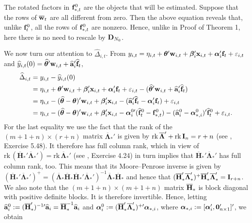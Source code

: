 \documentclass[12pt,fleqn]{article}
\begin{document}
The rotated factors in $\mathbf{f}_{*,t}^0$ are the objects that will be estimated. Suppose that the rows of $\overline {\mathbf{w}}_{t}$ are all different from zero. Then the above equation reveals that, unlike $\mathbf{f}_{t}^0$, all the rows of $\mathbf{f}_{*,t}^0$ are nonzero. Hence, unlike in Proof of Theorem 1, here there is no need to rescale by $\mathbf{D}_{N_0}$.

We now turn our attention to $\widehat \Delta_{i,t}$. From $y_{i,t} = \eta_{i,t} + \boldsymbol{\theta}'\mathbf{w}_{i,t} + \boldsymbol{\beta}_i'\mathbf{x}_{i,t} + \boldsymbol{\alpha}_i'\mathbf{f}_t + \varepsilon_{i,t}$ and $\widehat y_{i,t}(0) = \widehat{\boldsymbol{\theta}}'\mathbf{w}_{i,t} + \widehat{\mathbf{a}}_{i}'\widehat{\mathbf{f}}_{t}$,
\begin{align}
\widehat \Delta_{i,t} & = y_{i,t} - \widehat y_{i,t}(0) \notag\\
& = \eta_{i,t} + \boldsymbol{\theta}'\mathbf{w}_{i,t} + \boldsymbol{\beta}_i'\mathbf{x}_{i,t} + \boldsymbol{\alpha}_i'\mathbf{f}_t + \varepsilon_{i,t} - (\widehat{\boldsymbol{\theta}}'\mathbf{w}_{i,t} +  \widehat{\mathbf{a}}_{i}'\widehat{\mathbf{f}}_{t} )  \notag\\
& = \eta_{i,t} - (\widehat{\boldsymbol{\theta}} - \boldsymbol{\theta})'\mathbf{w}_{i,t} + \boldsymbol{\beta}_i'\mathbf{x}_{i,t} - (\widehat{\mathbf{a}}_{i}'\widehat{\mathbf{f}}_{t} - \boldsymbol{\alpha}_i'\mathbf{f}_t)  + \varepsilon_{i,t}\notag\\
& = \eta_{i,t} - (\widehat{\boldsymbol{\theta}} - \boldsymbol{\theta})'\mathbf{w}_{i,t}  + \boldsymbol{\beta}_i'\mathbf{x}_{i,t}  - \boldsymbol{\alpha}_{i}^{0\prime}(\widehat{\mathbf{f}}_{t}^0-\mathbf{f}_{*,t}^0) - (\widehat{\mathbf{a}}_{i}^{0} - \boldsymbol{\alpha}_{*,i}^0)'\widehat{\mathbf{f}}_{t}^0 + \varepsilon_{i,t}.
\end{align}
For the last equality we use the fact that the rank of the $(m+1+n)\times (r+n)$ matrix $\overline{\boldsymbol{\Lambda}}_*'$ is given by $\mathrm{rk}\,\overline{\boldsymbol{\Lambda}}' + \mathrm{rk}\,\mathbf{I}_{n} = r +n$ (see \citealp{abadir2005matrix}, Exercise 5.48). It therefore has full column rank, which in view of $\mathrm{rk}\,(\overline{\mathbf{H}}_*'\overline{\boldsymbol{\Lambda}}_*') = \mathrm{rk}\, \overline{\boldsymbol{\Lambda}}_*'$ (see \citealp{abadir2005matrix}, Exercise 4.24) in turn implies that $\overline{\mathbf{H}}_*'\overline{\boldsymbol{\Lambda}}_*'$ has full column rank, too. This means that its Moore--Penrose inverse is given by $(\overline{\mathbf{H}}_*'\overline{\boldsymbol{\Lambda}}_*')^+ = (\overline{\boldsymbol{\Lambda}}_*\overline{\mathbf{H}}_*\overline{\mathbf{H}}_*'\overline{\boldsymbol{\Lambda}}_*')^{-1} \overline{\boldsymbol{\Lambda}}_*\overline{\mathbf{H}}_*$ and hence that $(\overline{\mathbf{H}}_*'\overline{\boldsymbol{\Lambda}}_*')^+\overline{\mathbf{H}}_*'\overline{\boldsymbol{\Lambda}}_*' = \mathbf{I}_{r+n}$. We also note that the $(m+1+n)\times (m+1+n)$ matrix $\overline{\mathbf{H}}_*$ is block diagonal with positive definite blocks. It is therefore invertible. Hence, letting $\widehat{\mathbf{a}}_{i}^0 := (\overline{\mathbf{H}}_*')^{-1\prime}\widehat{\mathbf{a}}_{i} = \overline{\mathbf{H}}_*^{-1}\widehat{\mathbf{a}}_{i}$ and $\boldsymbol{\alpha}_{i}^0 := (\overline{\mathbf{H}}_*'\overline{\boldsymbol{\Lambda}}_*')^{+\prime} \boldsymbol{\alpha}_{*,i}$, where $\boldsymbol{\alpha}_{*,i} := [\boldsymbol{\alpha}_i', \mathbf{0}_{n\times 1}']'$, we obtain
\end{document}
